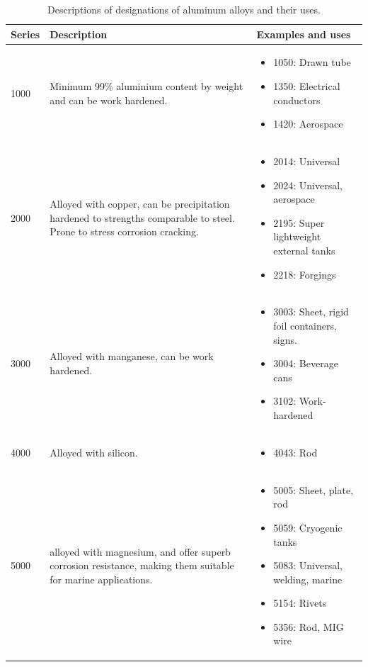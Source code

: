 \documentclass[
10pt,
a4paper,
openany,
svgnames,
]{book}
\begin{document}
\begin{table}[H]
  \caption{Descriptions of designations of aluminum alloys and their uses.}
  \label{tab: alum alloy description}
  \centering
  \begin{tabular}{lp{6cm}p{6cm}}
    \toprule
    Series & Description & Examples and uses \\
    \midrule
    1000 & Minimum 99\% aluminium content by weight and can be work hardened. & \begin{itemize}
    \item 1050: Drawn tube
    \item 1350: Electrical conductors
    \item 1420: Aerospace
    \end{itemize} \\
    2000 & Alloyed with copper, can be precipitation hardened to strengths comparable to steel. Prone to stress corrosion cracking. & \begin{itemize}
    \item 2014: Universal
    \item 2024: Universal, aerospace
    \item 2195: Super lightweight external tanks
    \item 2218: Forgings 
    \end{itemize} \\
    3000 & Alloyed with manganese, can be work hardened. & \begin{itemize}
    \item 3003: Sheet, rigid foil containers, signs.
    \item 3004: Beverage cans
    \item 3102: Work-hardened
    \end{itemize} \\
    4000 & Alloyed with silicon. & \begin{itemize}
    \item 4043: Rod
    \end{itemize} \\
    5000 & alloyed with magnesium, and offer superb corrosion resistance, making them suitable for marine applications. & \begin{itemize}
    \item 5005: Sheet, plate, rod
    \item 5059: Cryogenic tanks
    \item 5083: Universal, welding, marine
    \item 5154: Rivets
    \item 5356: Rod, MIG wire

\end{itemize}
\end{tabular}
\end{table}
\end{document}
